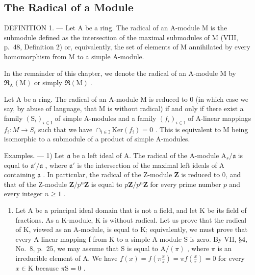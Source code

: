\subsection{The Radical of a Module}

DEFINITION 1. --- Let A be a ring. The radical of an A-module M is the submodule defined as the intersection of the maximal submodules of M (VIII, p.~48, Definition 2) or, equivalently, the set of elements of M annihilated by every homomorphism from M to a simple A-module.

In the remainder of this chapter, we denote the radical of an A-module M by \(\mathfrak{R}_{\mathrm{A}}(\mathrm{M})\) or simply \(\mathfrak{R}(\mathrm{M})\) .

Let A be a ring. The radical of an A-module M is reduced to 0 (in which case we say, by abuse of language, that M is without radical) if and only if there exist a family \((\mathrm{S}_{i})_{i\in\mathrm{I}}\) of simple A-modules and a family \((f_{i})_{i\in\mathrm{I}}\) of A-linear mappings \(f_{i}:M\to S_{i}\) such that we have \(\cap_{i\in\mathrm{I}}\mathrm{Ker}(f_{i})=0\) . This is equivalent to M being isomorphic to a submodule of a product of simple A-modules.

Examples. --- 1) Let \(\mathfrak{a}\) be a left ideal of A. The radical of the A-module \(\mathrm{A}_s / \mathfrak{a}\) is equal to \(\mathfrak{a}' / \mathfrak{a}\) , where \(\mathfrak{a}'\) is the intersection of the maximal left ideals of A containing \(\mathfrak{a}\) . In particular, the radical of the Z-module \(\mathbf{Z}\) is reduced to 0, and that of the Z-module \(\mathbf{Z} / p^n\mathbf{Z}\) is equal to \(p\mathbf{Z} / p^n\mathbf{Z}\) for every prime number \(p\) and every integer \(n \geqslant 1\) .

\begin{enumerate}
\def\labelenumi{\arabic{enumi})}
\setcounter{enumi}{1}
\tightlist
\item
  Let A be a principal ideal domain that is not a field, and let K be its field of fractions. As a K-module, K is without radical. Let us prove that the radical of K, viewed as an A-module, is equal to K; equivalently, we must prove that every A-linear mapping f from K to a simple A-module S is zero. By VII, §4, No.~8, p.~25, we may assume that S is equal to \(\mathrm{A}/(\pi)\) , where \(\pi\) is an irreducible element of A. We have \(f(x) = f\left(\pi \frac{x}{\pi}\right) = \pi f\left(\frac{x}{\pi}\right) = 0\) for every \(x \in \mathrm{K}\) because \(\pi \mathrm{S} = 0\) .
\end{enumerate}

